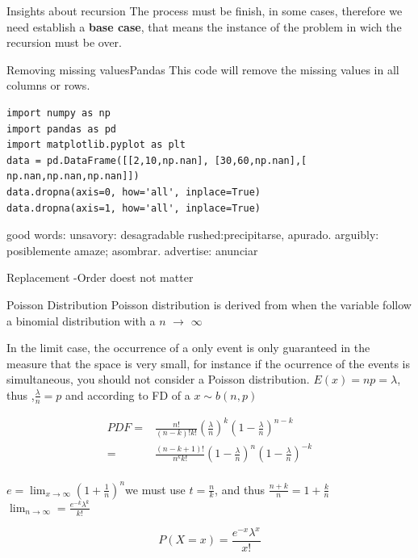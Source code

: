 \documentclass{beamer}
\begin{document}
\begin{frame}{Insights about recursion}
The process must be finish, in some cases, therefore we need establish a \textbf{base case}, that means the instance of the problem in wich the recursion must be over. 
\end{frame}





\begin{frame}[fragile]{Removing missing values}{Pandas}
This code will remove the missing values in all columns or rows. 
\begin{lstlisting}
import numpy as np
import pandas as pd 
import matplotlib.pyplot as plt
data = pd.DataFrame([[2,10,np.nan], [30,60,np.nan],[ np.nan,np.nan,np.nan]])
data.dropna(axis=0, how='all', inplace=True)
data.dropna(axis=1, how='all', inplace=True)
\end{lstlisting}
\end{frame}






\begin{frame}
good words:
unsavory: desagradable
rushed:precipitarse, apurado.
arguibly: posiblemente
amaze; asombrar.
advertise: anunciar

\end{frame}



\begin{frame}{Replacement -Order doest not matter}
\end{frame}






\begin{frame}{Poisson Distribution}
Poisson distribution is derived from  when the variable follow a binomial distribution with a  $n $ $\to$  $\infty $

In the limit case, the occurrence of  a only event is only guaranteed in the measure that the space is very small, for instance if the ocurrence of the events is simultaneous, you should not consider a Poisson distribution. $E(x)= np = \lambda$, thus ,$\frac{\lambda}{n}=p$  and according to FD of a $x \sim b(n,p)$

\begin{equation}
\begin{split}
PDF = &\frac{n!}{(n-k)!k!}(\frac{\lambda}{n})^{k} (1-\frac{\lambda}{n})^{n-k} \\
= &\frac{(n-k+1)!}{n^{k}k!} ( 1 - \frac{\lambda}{n})^{n}  ( 1 -\frac{\lambda}{n})^{-k}  \\
\end{split}
\end{equation}

$e=\lim_{x \to \infty} (1+\frac{1}{n})^n$we must use $t=\frac{n}{k}$,  and thus $ \frac{n+k}{n} = 1+\frac{k}{n}$
 $\lim_{n \to \infty} = \frac{e^{-k} \lambda^{k} }{k!}$ 
 
\begin{equation}
P(X=x)=\frac{e^{-x}\lambda^{x}}{x!}
\end{equation}
\end{frame}
\end{document}
